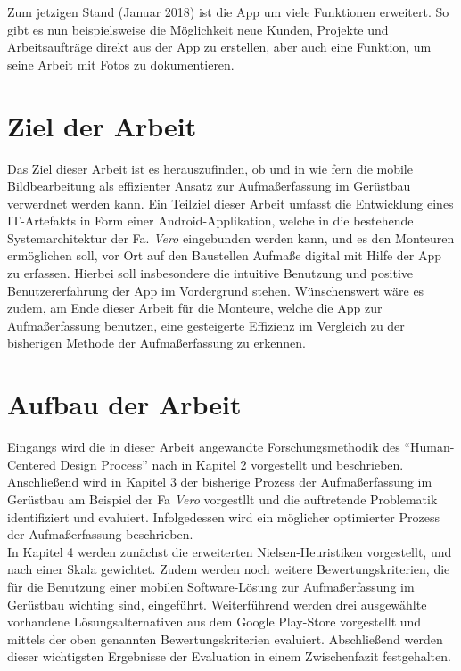 Zum jetzigen Stand (Januar 2018) ist die App um viele Funktionen erweitert. So gibt es nun beispielsweise die Möglichkeit neue Kunden, Projekte und Arbeitsaufträge direkt aus der App zu erstellen, aber auch eine Funktion, um seine Arbeit mit Fotos zu dokumentieren. 

\section{Ziel der Arbeit}
Das Ziel dieser Arbeit ist es herauszufinden, ob und in wie fern die mobile Bildbearbeitung als effizienter Ansatz zur Aufmaßerfassung im Gerüstbau verwerdnet werden kann.
Ein Teilziel dieser Arbeit umfasst die Entwicklung eines IT-Artefakts in Form einer Android-Applikation, welche in die bestehende Systemarchitektur der Fa. \emph{Vero} eingebunden werden kann, und es den Monteuren ermöglichen soll, vor Ort auf den Baustellen Aufmaße digital mit Hilfe der App zu erfassen.
Hierbei soll insbesondere die intuitive Benutzung und positive Benutzererfahrung der App im Vordergrund stehen.
Wünschenswert wäre es zudem, am Ende dieser Arbeit für die Monteure, welche die App zur Aufmaßerfassung benutzen, eine gesteigerte Effizienz im Vergleich zu der bisherigen Methode der Aufmaßerfassung zu erkennen.


\section{Aufbau der Arbeit}
Eingangs wird die in dieser Arbeit angewandte Forschungsmethodik des ``Human-Centered Design Process'' nach \citeauthor{Norman13} in Kapitel 2 vorgestellt und beschrieben. \\

Anschließend wird in Kapitel 3 der bisherige Prozess der Aufmaßerfassung im Gerüstbau am Beispiel der Fa \emph{Vero} vorgestllt und die auftretende Problematik identifiziert und evaluiert. 
Infolgedessen wird ein möglicher optimierter Prozess der Aufmaßerfassung beschrieben. \\

In Kapitel 4 werden zunächst die erweiterten Nielsen-Heuristiken vorgestellt, und nach einer Skala gewichtet.
Zudem werden noch weitere Bewertungskriterien, die für die Benutzung einer mobilen Software-Lösung zur Aufmaßerfassung im Gerüstbau wichting sind, eingeführt.
Weiterführend werden drei ausgewählte vorhandene Lösungsalternativen aus dem Google Play-Store vorgestellt und mittels der oben genannten Bewertungskriterien evaluiert.
Abschließend werden dieser wichtigsten Ergebnisse der Evaluation in einem Zwischenfazit festgehalten. \\

